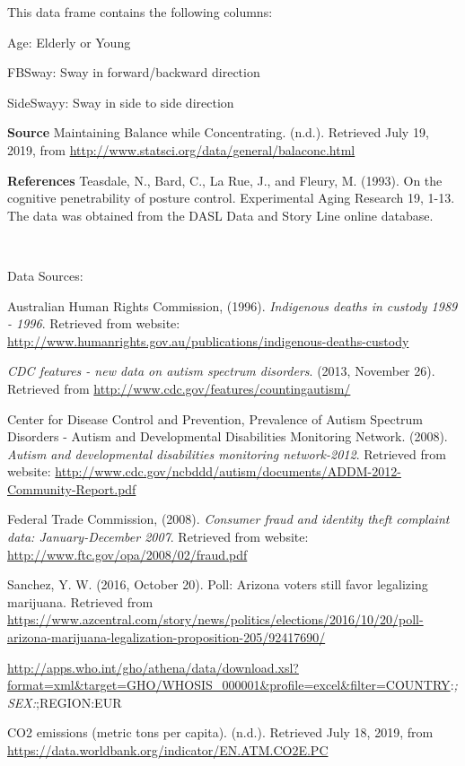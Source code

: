 \documentclass[
]{book}
\begin{document}
This data frame contains the following columns:

Age: Elderly or Young

FBSway: Sway in forward/backward direction

SideSwayy: Sway in side to side direction

\textbf{Source}
Maintaining Balance while Concentrating. (n.d.). Retrieved July 19, 2019, from \url{http://www.statsci.org/data/general/balaconc.html}

\textbf{References}
Teasdale, N., Bard, C., La Rue, J., and Fleury, M. (1993). On the cognitive penetrability of posture control. Experimental Aging Research 19, 1-13.
The data was obtained from the DASL Data and Story Line online database.

\textbf{\\
}

Data Sources:

Australian Human Rights Commission, (1996). \emph{Indigenous deaths in
custody 1989 - 1996}. Retrieved from website:
\url{http://www.humanrights.gov.au/publications/indigenous-deaths-custody}

\emph{CDC features - new data on autism spectrum disorders}. (2013, November
26). Retrieved from \url{http://www.cdc.gov/features/countingautism/}

Center for Disease Control and Prevention, Prevalence of Autism Spectrum
Disorders - Autism and Developmental Disabilities Monitoring Network.
(2008). \emph{Autism and developmental disabilities monitoring network-2012}.
Retrieved from website:
\url{http://www.cdc.gov/ncbddd/autism/documents/ADDM-2012-Community-Report.pdf}

Federal Trade Commission, (2008). \emph{Consumer fraud and identity theft
complaint data: January-December 2007}. Retrieved from website:
\url{http://www.ftc.gov/opa/2008/02/fraud.pdf}

Sanchez, Y. W. (2016, October 20). Poll: Arizona voters still favor legalizing marijuana. Retrieved from \url{https://www.azcentral.com/story/news/politics/elections/2016/10/20/poll-arizona-marijuana-legalization-proposition-205/92417690/}

\url{http://apps.who.int/gho/athena/data/download.xsl?format=xml\&target=GHO/WHOSIS_000001\&profile=excel\&filter=COUNTRY}:\emph{;SEX:};REGION:EUR

CO2 emissions (metric tons per capita). (n.d.). Retrieved July 18, 2019, from \url{https://data.worldbank.org/indicator/EN.ATM.CO2E.PC}
\end{document}
